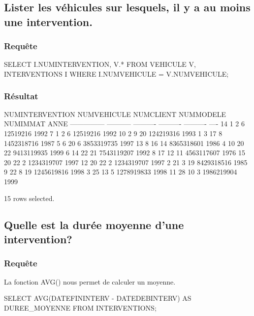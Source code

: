 \documentclass[•]{article}
\begin{document}
\subsection{Lister les véhicules sur lesquels, il y a au moins une intervention.}
\subsubsection{Requête}
\begin{sql}
SELECT I.NUMINTERVENTION, V.* FROM VEHICULE V, INTERVENTIONS I WHERE I.NUMVEHICULE = V.NUMVEHICULE;
\end{sql}
\subsubsection{Résultat}
\begin{sql}
NUMINTERVENTION NUMVEHICULE  NUMCLIENT  NUMMODELE   NUMIMMAT ANNE
--------------- ----------- ---------- ---------- ---------- ----
             14           1          2          6   12519216 1992
              7           1          2          6   12519216 1992
             10           2          9         20  124219316 1993
              1           3         17          8 1452318716 1987
              5           6         20          6 3853319735 1997
             13           8         16         14 8365318601 1986
              4          10         20         22 9413119935 1999
              6          14         22         21 7543119207 1992
              8          17         12         11 4563117607 1976
             15          20         22          2 1234319707 1997
             12          20         22          2 1234319707 1997
              2          21          3         19 8429318516 1985
              9          22          8         19 1245619816 1998
              3          25         13          5 1278919833 1998
             11          28         10          3 1986219904 1999

15 rows selected.
\end{sql}
\subsection{Quelle est la durée moyenne d’une intervention?}
\subsubsection{Requête}
\textrm{La fonction AVG() nous permet de calculer un moyenne. }
\begin{sql}
SELECT AVG(DATEFININTERV - DATEDEBINTERV) AS DUREE_MOYENNE FROM INTERVENTIONS;\end{sql}
\end{document}
